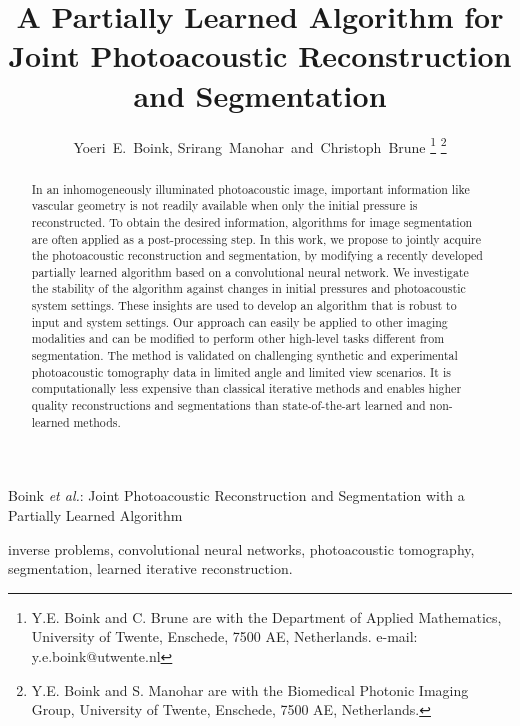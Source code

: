 \documentclass[journal]{IEEEtran}
\begin{document}
\title{A Partially Learned Algorithm for Joint Photoacoustic Reconstruction and Segmentation}

\author{Yoeri~E.~Boink, Srirang~Manohar~and~Christoph~Brune\vspace{-5mm}%
\thanks{Y.E. Boink and C. Brune are with the Department
of Applied Mathematics, University of Twente, Enschede, 7500 AE, Netherlands. e-mail: y.e.boink@utwente.nl}%
\thanks{Y.E. Boink and S. Manohar are with the Biomedical Photonic Imaging Group, University of Twente, Enschede, 7500 AE, Netherlands.}}

%
{Boink \MakeLowercase{\textit{et al.}}: Joint Photoacoustic Reconstruction and Segmentation with a Partially Learned Algorithm}

\maketitle

\begin{abstract}
In an inhomogeneously illuminated photoacoustic image, important information like vascular geometry is not readily available when only the initial pressure is reconstructed. To obtain the desired information, algorithms for image segmentation are often applied as a post-processing step. In this work, we propose to jointly acquire the photoacoustic reconstruction and segmentation, by modifying a recently developed partially learned algorithm based on a convolutional neural network. We investigate the stability of the algorithm against changes in initial pressures and photoacoustic system settings. These insights are used to develop an algorithm that is robust to input and system settings. Our approach can easily be applied to other imaging modalities and can be modified to perform other high-level tasks different from segmentation. The method is validated on challenging synthetic and experimental photoacoustic tomography data in limited angle and limited view scenarios. It is computationally less expensive than classical iterative methods and enables higher quality reconstructions and segmentations than state-of-the-art learned and non-learned methods.
\end{abstract}

\begin{IEEEkeywords}
inverse problems, convolutional neural networks, photoacoustic tomography, segmentation, learned iterative reconstruction.
\end{IEEEkeywords}
\end{document}

